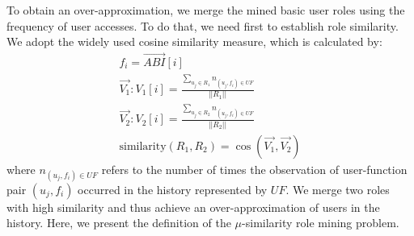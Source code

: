 To obtain an over-approximation,
we merge the mined basic user roles using the frequency of user accesses.
To do that, we need first to establish role similarity.
We adopt the widely used cosine similarity measure, which is calculated by:
\begin{align}
	f_i = \vec{\mathit{ABI}}[i] \\
	\vec{V_1}: V_1[i] = \frac{\sum_{u_j \in R_1} n_{(u_j, f_i) \in \mathit{UF}}}{||R_1||}  \\
	\vec{V_2}: V_2[i] = \frac{\sum_{u_j \in R_2} n_{(u_j, f_i) \in \mathit{UF}}}{||R_2||} \\
	\mathrm{similarity}(R_1, R_2) = \cos(\vec{V_1}, \vec{V_2})
\end{align}
where $n_{(u_j, f_i) \in \mathit{UF}}$ refers to the number of times the observation of user-function pair $(u_j, f_i)$ occurred in the history represented by $\mathit{UF}$.
We merge two roles with high similarity and thus achieve an over-approximation of users in the history.
Here, we present the definition of the $\mu$-similarity role mining problem.

